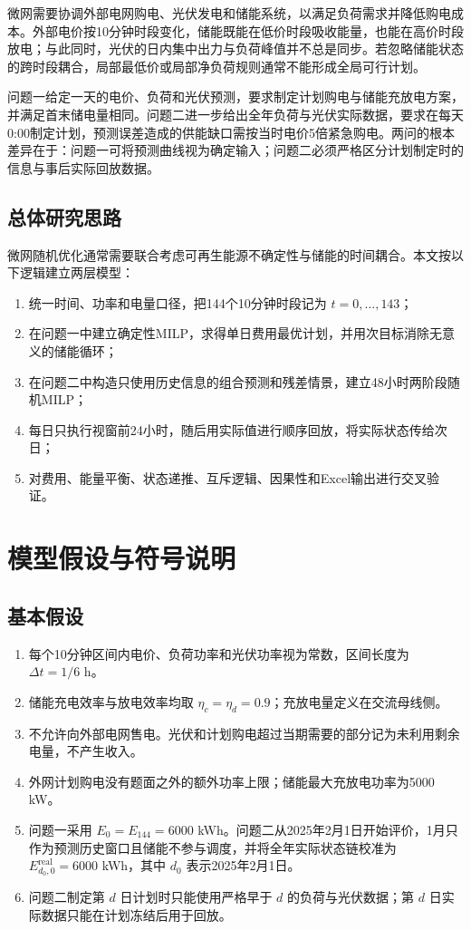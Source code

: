 \documentclass[UTF8,12pt,a4paper]{ctexart}
\begin{document}
微网需要协调外部电网购电、光伏发电和储能系统，以满足负荷需求并降低购电成本。外部电价按10分钟时段变化，储能既能在低价时段吸收能量，也能在高价时段放电；与此同时，光伏的日内集中出力与负荷峰值并不总是同步。若忽略储能状态的跨时段耦合，局部最低价或局部净负荷规则通常不能形成全局可行计划。

问题一给定一天的电价、负荷和光伏预测，要求制定计划购电与储能充放电方案，并满足首末储电量相同。问题二进一步给出全年负荷与光伏实际数据，要求在每天0:00制定计划，预测误差造成的供能缺口需按当时电价5倍紧急购电。两问的根本差异在于：问题一可将预测曲线视为确定输入；问题二必须严格区分计划制定时的信息与事后实际回放数据。

\subsection{总体研究思路}

微网随机优化通常需要联合考虑可再生能源不确定性与储能的时间耦合\cite{liang2014stochastic}。本文按以下逻辑建立两层模型：

\begin{enumerate}
  \item 统一时间、功率和电量口径，把144个10分钟时段记为 $t=0,\ldots,143$；
  \item 在问题一中建立确定性MILP，求得单日费用最优计划，并用次目标消除无意义的储能循环；
  \item 在问题二中构造只使用历史信息的组合预测和残差情景，建立48小时两阶段随机MILP；
  \item 每日只执行视窗前24小时，随后用实际值进行顺序回放，将实际状态传给次日；
  \item 对费用、能量平衡、状态递推、互斥逻辑、因果性和Excel输出进行交叉验证。
\end{enumerate}

\section{模型假设与符号说明}

\subsection{基本假设}

\begin{enumerate}
  \item 每个10分钟区间内电价、负荷功率和光伏功率视为常数，区间长度为 $\Delta t=1/6$ h。
  \item 储能充电效率与放电效率均取 $\eta_c=\eta_d=0.9$；充放电量定义在交流母线侧。
  \item 不允许向外部电网售电。光伏和计划购电超过当期需要的部分记为未利用剩余电量，不产生收入。
  \item 外网计划购电没有题面之外的额外功率上限；储能最大充放电功率为5000 kW。
  \item 问题一采用 $E_0=E_{144}=6000$ kWh。问题二从2025年2月1日开始评价，1月只作为预测历史窗口且储能不参与调度，并将全年实际状态链校准为 $E_{d_0,0}^{\mathrm{real}}=6000$ kWh，其中 $d_0$ 表示2025年2月1日。
  \item 问题二制定第 $d$ 日计划时只能使用严格早于 $d$ 的负荷与光伏数据；第 $d$ 日实际数据只能在计划冻结后用于回放。
\end{enumerate}
\end{document}
